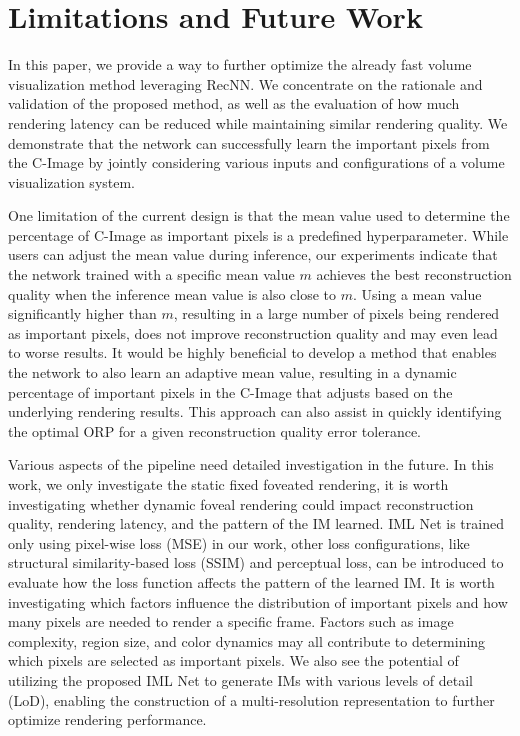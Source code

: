 \section{Limitations and Future Work}
In this paper, we provide a way to further optimize the already fast volume visualization method leveraging RecNN. We concentrate on the rationale and validation of the proposed method, as well as the evaluation of how much rendering latency can be reduced while maintaining similar rendering quality. We demonstrate that the network can successfully learn the important pixels from the C-Image by jointly considering various inputs and configurations of a volume visualization system. 

One limitation of the current design is that the mean value used to determine the percentage of C-Image as important pixels is a predefined hyperparameter. While users can adjust the mean value during inference, our experiments indicate that the network trained with a specific mean value $m$ achieves the best reconstruction quality when the inference mean value is also close to $m$. Using a mean value significantly higher than $m$, resulting in a large number of pixels being rendered as important pixels, does not improve reconstruction quality and may even lead to worse results. It would be highly beneficial to develop a method that enables the network to also learn an adaptive mean value, resulting in a dynamic percentage of important pixels in the C-Image that adjusts based on the underlying rendering results. This approach can also assist in quickly identifying the optimal ORP for a given reconstruction quality error tolerance. 

Various aspects of the pipeline need detailed investigation in the future. In this work, we only investigate the static fixed foveated rendering, it is worth investigating whether dynamic foveal rendering could impact reconstruction quality, rendering latency, and the pattern of the IM learned. IML Net is trained only using pixel-wise loss (MSE) in our work, other loss configurations, like structural similarity-based loss (SSIM) and perceptual loss, can be introduced to evaluate how the loss function affects the pattern of the learned IM. It is worth investigating which factors influence the distribution of important pixels and how many pixels are needed to render a specific frame. Factors such as image complexity, region size, and color dynamics may all contribute to determining which pixels are selected as important pixels. We also see the potential of utilizing the proposed IML Net to generate IMs with various levels of detail (LoD), enabling the construction of a multi-resolution representation to further optimize rendering performance. 



